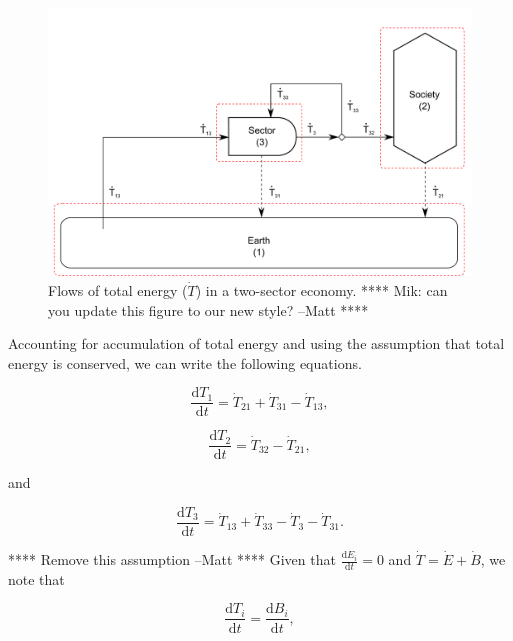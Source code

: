 \begin{figure}[h!]
\includegraphics[width=0.9\linewidth]{Part_2/Chapter_Embodied/images/I-O_two_sector_total_energy.pdf}
\caption{Flows of total energy ($\dot{T}$) in a two-sector economy.
**** Mik: can you update this figure to our new style? --Matt ****}
\label{fig:B_total_energy}
\end{figure}

Accounting for accumulation of total energy and using the assumption 
that total energy is conserved, we can write the following equations.

\begin{equation} \label{eq:CV_T_1}
	\frac{\mathrm{d}T_{1}}{\mathrm{d}t} 	 
	= \dot{T}_{21} 
	+ \dot{T}_{31} 
	- \dot{T}_{13},
\end{equation}

\begin{equation} \label{eq:CV_T_2}
	\frac{\mathrm{d}T_{2}}{\mathrm{d}t} 	 
	= \dot{T}_{32} 
	- \dot{T}_{21},
\end{equation}

\noindent and

\begin{equation} \label{eq:CV_T_3}
	\frac{\mathrm{d}T_{3}}{\mathrm{d}t} 	 
	= \dot{T}_{13} 
	+ \dot{T}_{33} 
	- \dot{T}_{3} 
	- \dot{T}_{31}.
\end{equation}

**** Remove this assumption --Matt **** 
Given that 
$\frac{\mathrm{d}E_{i}}{\mathrm{d}t} 
		= 0$ and $\dot{T} = \dot{E} + \dot{B}$, 
we note that

\begin{equation} \label{eq:T_dot_equals_B_dot}
	\frac{\mathrm{d}T_i}{\mathrm{d}t} = \frac{\mathrm{d}B_i}{\mathrm{d}t},
\end{equation}

